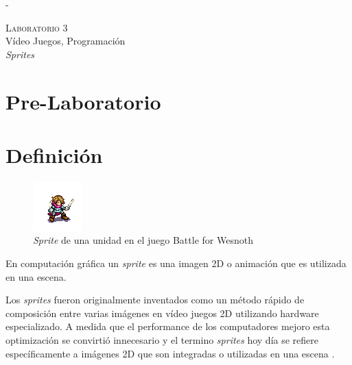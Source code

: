 -\begin{center}
\textsc{\Large Laboratorio 3}~\\
{\large Vídeo Juegos, Programación}~\\
\emph{Sprites}
\end{center}

\section{Pre-Laboratorio}

\section{Definición}
\setlength\intextsep{0pt}
\begin{figure}
\includegraphics[width=\linewidth]{semana3/sprite_ej1.png} 
\caption{\emph{Sprite} de una unidad en el juego Battle for Wesnoth \cite{wesnothgame}}
\end{figure}

En computación gráfica un \emph{sprite} es una imagen 2D o animación que es utilizada en una escena.

Los \emph{sprites} fueron originalmente inventados como un método rápido de composición entre varias imágenes en vídeo juegos 2D utilizando hardware especializado. A medida que el performance de los computadores mejoro esta optimización se convirtió innecesario y el termino \emph{sprites} hoy día se refiere específicamente a imágenes 2D que son integradas o utilizadas en una escena \cite{sprites_siggraph}.


